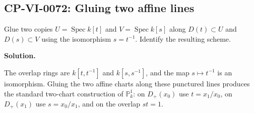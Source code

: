 
\subsection*{CP-VI-0072: Gluing two affine lines}

Glue two copies $U=\operatorname{Spec}k[t]$ and $V=\operatorname{Spec}k[s]$ along $D(t)\subset U$ and $D(s)\subset V$ using the isomorphism $s=t^{-1}$. Identify the resulting scheme.

\medskip
\noindent\textbf{Solution.}

The overlap rings are $k[t,t^{-1}]$ and $k[s,s^{-1}]$, and the map $s\mapsto t^{-1}$ is an isomorphism. Gluing the two affine charts along these punctured lines produces the standard two-chart construction of $\mathbb P_k^1$: on $D_+(x_0)$ use $t=x_1/x_0$, on $D_+(x_1)$ use $s=x_0/x_1$, and on the overlap $st=1$.
